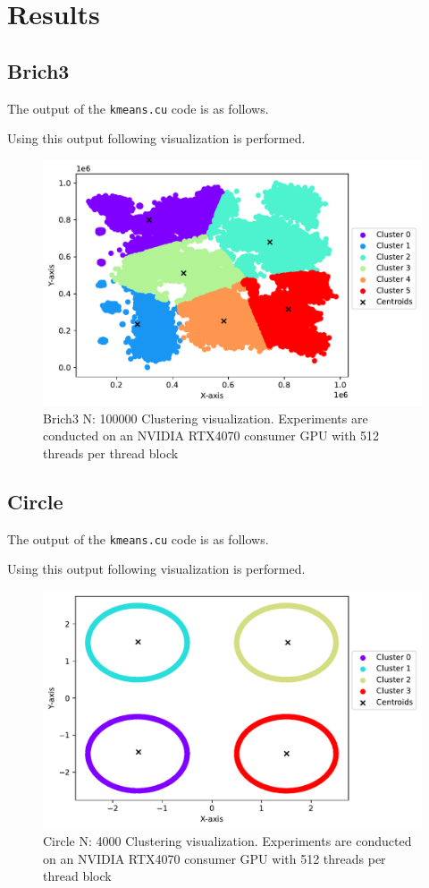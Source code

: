 \section{Results}

\subsection{Brich3}
The output of the \texttt{kmeans.cu} code is as follows.


Using this output following visualization is performed.
\begin{figure}[H]
    \centering
    \includegraphics[width=.8\textwidth]{figures/plots/brich3.pdf}
    \caption{Brich3 N: 100000 Clustering visualization. Experiments are conducted on an NVIDIA RTX4070 consumer GPU with 512 threads per thread block}
    \label{brich}
\end{figure}

\newpage
\subsection{Circle}
The output of the \texttt{kmeans.cu} code is as follows.

Using this output following visualization is performed.

\begin{figure}[H]
    \centering
    \includegraphics[width=.8\textwidth]{figures/plots/circle.pdf}
    \caption{Circle N: 4000 Clustering visualization. Experiments are conducted on an NVIDIA RTX4070 consumer GPU with 512 threads per thread block}
    \label{circle}
\end{figure}

